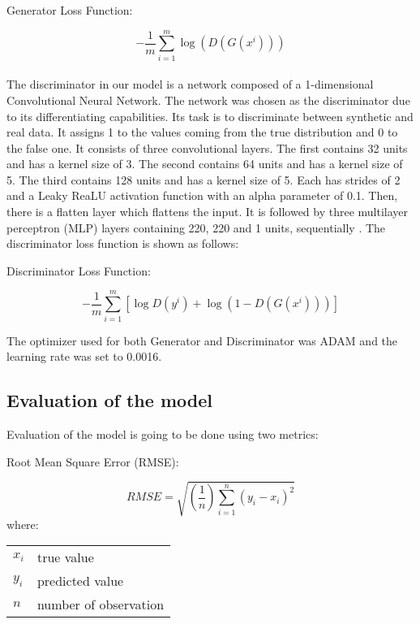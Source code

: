 \documentclass[11pt]{article} %
\makeatletter
\newenvironment{conditions}
  {\par\vspace{\abovedisplayskip}\noindent\begin{tabular}{>{$}l<{$} @{${}={}$} l}}
  {\end{tabular}\par\vspace{\belowdisplayskip}}
\makeatother
\begin{document}
\begin{center}   Generator Loss Function:  \end{center}
\begin{equation}
-\frac{1}{m} \sum_{i=1}^{m} \log \left(D\left(G\left(x^{i}\right)\right)\right)
\end{equation}\\

The discriminator in our model is a network composed of a 1-dimensional Convolutional Neural Network. The network was chosen as the discriminator due to its differentiating capabilities. Its task is to discriminate between synthetic and real data. It assigns 1 to the values coming from the true distribution and 0 to the false one. It consists of three convolutional layers. The first contains 32 units and has a kernel size of 3. The second contains 64 units and has a kernel size of 5. The third contains 128 units and has a kernel size of 5. Each has strides of 2 and a Leaky ReaLU activation function with an alpha parameter of 0.1. Then, there is a flatten layer which flattens the input. It is followed by three multilayer perceptron (MLP) layers containing 220, 220 and 1 units, sequentially \cite{gan-stock}\cite{gan-stock2}. 
The discriminator loss function is shown as follows: 
\begin{center}  Discriminator Loss Function: \end{center}
\begin{equation}
-\frac{1}{m} \sum_{i=1}^{m}\left[\log D\left(y^{i}\right)+\log \left(1-D\left(G\left(x^{i}\right)\right)\right)\right]
\end{equation}

The optimizer used for both Generator and Discriminator was ADAM and the learning rate was set to 0.0016.

\subsection{Evaluation of the model}

Evaluation of the model is going to be done using two metrics:  \\ 

\begin{center}   Root Mean Square Error (RMSE):  \end{center}
\begin{equation}  RMSE = \sqrt{(\frac{1}{n})\sum_{i=1}^{n}(y_{i} - x_{i})^{2}} \end{equation}
where:
\begin{conditions}
 x_i     &  true value \\
 y_i     &  predicted value \\   
 n &  number of observation
\end{conditions}
\end{document}
